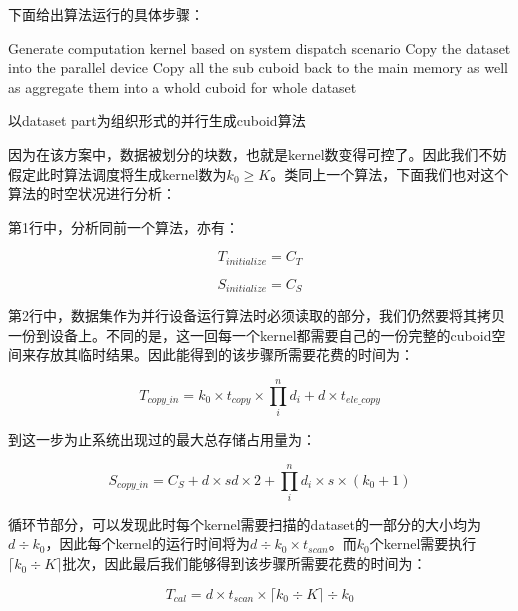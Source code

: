 下面给出算法运行的具体步骤：

\begin{algorithm}[htbp]
\SetAlgoLined
{}
Generate computation kernel based on system dispatch scenario\;
Copy the dataset into the parallel device\;
Copy all the sub cuboid back to the main memory as well as aggregate them into a whold cuboid for whole dataset\;
\caption{以dataset part为组织形式的并行生成cuboid算法}
\label{algo:algorithm2}
\end{algorithm}

因为在该方案中，数据被划分的块数，也就是kernel数变得可控了。因此我们不妨假定此时算法调度将生成kernel数为$k_0 \geq K$。类同上一个算法，下面我们也对这个算法的时空状况进行分析：

第1行中，分析同前一个算法，亦有：

\begin{equation}
T_{initialize} = C_T
\end{equation}

\begin{equation}
S_{initialize} = C_S
\end{equation}

第2行中，数据集作为并行设备运行算法时必须读取的部分，我们仍然要将其拷贝一份到设备上。不同的是，这一回每一个kernel都需要自己的一份完整的cuboid空间来存放其临时结果。因此能得到的该步骤所需要花费的时间为：

\begin{equation}
T_{copy\_in} = k_0 \times t_{copy} \times \prod_{i}^{n} d_i + d \times t_{ele\_copy}
\end{equation}

到这一步为止系统出现过的最大总存储占用量为：

\begin{equation}
S_{copy\_in} = C_S + d \times sd \times 2 + \prod_{i}^{n} d_i \times s \times (k_0 + 1)
\end{equation}

循环节部分，可以发现此时每个kernel需要扫描的dataset的一部分的大小均为$d \div k_0$，因此每个kernel的运行时间将为$d \div k_0 \times t_{scan}$。而$k_0$个kernel需要执行$\lceil k_0 \div K \rceil$批次，因此最后我们能够得到该步骤所需要花费的时间为：

\begin{equation}
T_{cal} = d \times t_{scan} \times \lceil k_0 \div K \rceil \div k_0
\end{equation}

